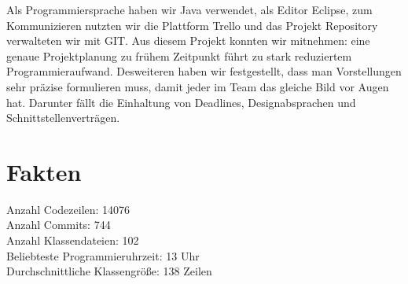\documentclass[a0, portrait, english, ngerman]{a0poster}
\begin{document}
\begin{multicols}{3}
Als Programmiersprache haben wir Java verwendet, als Editor Eclipse, zum Kommunizieren nutzten wir die Plattform Trello und das Projekt Repository verwalteten wir mit GIT.
Aus diesem Projekt konnten wir mitnehmen: eine genaue Projektplanung zu frühem Zeitpunkt führt zu stark reduziertem Programmieraufwand. Desweiteren haben wir festgestellt, dass man Vorstellungen sehr präzise formulieren muss, damit jeder im Team das gleiche Bild vor Augen hat. Darunter fällt die Einhaltung von Deadlines, Designabsprachen und Schnittstellenverträgen.

\section{Fakten}
Anzahl Codezeilen: 14076 \\
Anzahl Commits: 744\\
Anzahl Klassendateien: 102 \\
Beliebteste Programmieruhrzeit: 13 Uhr\\
Durchschnittliche Klassengrö\ss{}e: 138 Zeilen \\

\end{multicols}
\end{document}
